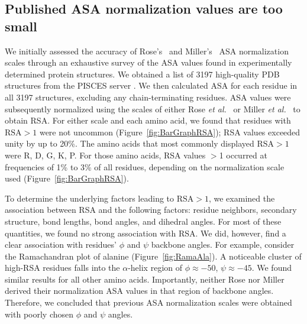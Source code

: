 \documentclass[11pt]{article}
\begin{document}
\subsection*{Published ASA normalization values are too small}
We initially assessed the accuracy of Rose's~\cite{Rose1985} and Miller's~\cite{Miller1987} ASA normalization scales through an exhaustive survey of the ASA values found in experimentally determined protein structures. We obtained a list of 3197 high-quality PDB structures from the PISCES server \cite{WangDunbrack2003}. We then calculated ASA for each residue in all 3197 structures, excluding any chain-terminating residues. ASA values were subsequently normalized using the scales of either Rose \emph{et al.}~\cite{Rose1985} or Miller \emph{et al.}~\cite{Miller1987} to obtain RSA. For either scale and each amino acid, we found that residues with $\text{RSA}>1$ were not uncommon (Figure~\ref{fig:BarGraphRSA}); RSA values exceeded unity by up to 20\%. The amino acids that most commonly displayed $\text{RSA}>1$ were R, D, G, K, P. For those amino acids, RSA values $>$1 occurred at frequencies of 1\% to 3\% of all residues, depending on the normalization scale used (Figure~\ref{fig:BarGraphRSA}).

To determine the underlying factors leading to $\text{RSA}>1$, we examined the association between RSA and the following factors: residue neighbors, secondary structure, bond lengths, bond angles, and dihedral angles. For most of these quantities, we found no strong association with RSA. We did, however, find a clear association with residues' $\phi$ and $\psi$ backbone angles. For example, consider the Ramachandran plot of alanine (Figure~\ref{fig:RamaAla}). A noticeable cluster of high-RSA residues falls into the $\alpha$-helix region of $\phi\approx-50$, $\psi\approx-45$. We found similar results for all other amino acids. Importantly, neither Rose nor Miller derived their normalization ASA values in that region of backbone angles. Therefore, we concluded that previous ASA normalization scales were obtained with poorly chosen $\phi$ and $\psi$ angles.
\end{document}
